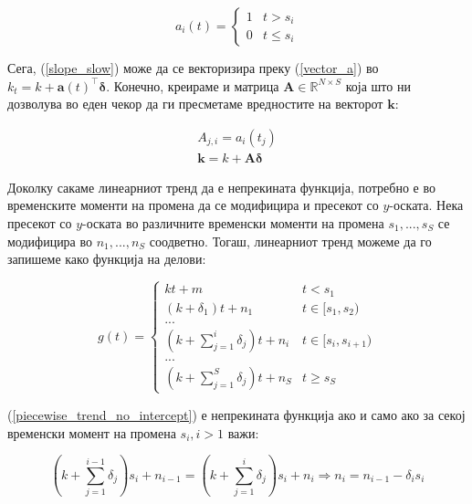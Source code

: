 \documentclass[12pt]{article}
\numberwithin{equation}{section}
\begin{document}
\begin{equation}\label{vector_a}
    a_i(t) = \begin{cases}
    1 & t > s_i \\
    0 & t \leq s_i
\end{cases}
\end{equation}

Сега, (\ref{slope_slow}) може да се векторизира преку (\ref{vector_a}) во \(k_t = k+\boldsymbol{a}(t)^{\top}\boldsymbol{\delta}\). Конечно, креираме и матрица \(\boldsymbol{A} \in \mathbb{R}^{N \times S}\) која што ни дозволува во еден чекор да ги пресметаме вредностите на векторот \(\boldsymbol{k}\):

\begin{equation}\label{matrix_a}
    \begin{aligned}
        A_{j,i} = a_i(t_j)\\
        \boldsymbol{k} = k + \boldsymbol{A}\boldsymbol{\delta}
    \end{aligned}
\end{equation}

Доколку сакаме линеарниот тренд да е непрекината функција, потребно е во временските моменти на промена да се модифицира и пресекот со \(y\)-оската. Нека пресекот со \(y\)-оската во различните временски моменти на промена \(s_1, ..., s_S\) се модифицира во \(n_1, ..., n_S\) соодветно. Тогаш, линеарниот тренд можеме да го запишеме како функција на делови:

\begin{equation}\label{piecewise_trend_no_intercept}
g(t) =
    \begin{cases}
        kt + m & t < s_1 \\
        (k + \delta_1)t + n_1 & t \in [s_1, s_2)\\
        ...\\
        (k + \sum_{j=1}^{i}\delta_j)t + n_i & t \in [s_i, s_{i+1})\\
        ...\\
        (k + \sum_{j=1}^{S}\delta_j)t + n_S & t \geq s_S
    \end{cases}
\end{equation}

(\ref{piecewise_trend_no_intercept}) е непрекината функција ако и само ако за секој временски момент на промена \(s_i, i > 1\) важи:

\begin{equation}\label{intercept_connection}
(k + \sum_{j=1}^{i - 1}\delta_j)s_i + n_{i-1} = (k + \sum_{j=1}^{i}\delta_j)s_i + n_i \Rightarrow n_i = n_{i-1} - \delta_is_i
\end{equation}
\end{document}
